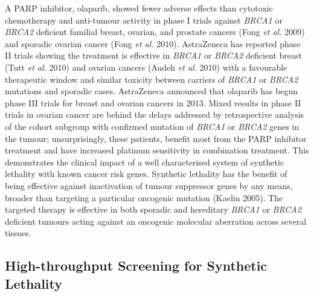 A PARP inhibitor, olaparib, showed fewer adverse effects than cytotoxic chemotherapy and anti-tumour activity in phase I trials against \textit{BRCA1} or \textit{BRCA2} deficient familial breast, ovarian, and prostate cancers (Fong\textit{ et al.} 2009) and sporadic ovarian cancer (Fong\textit{ et al.} 2010). AstraZeneca has reported phase II trials showing the treatment is effective in \textit{BRCA1} or \textit{BRCA2} deficient breast (Tutt\textit{ et al.} 2010) and ovarian cancers (Audeh\textit{ et al.} 2010) with a favourable therapeutic window and similar toxicity between carriers of \textit{BRCA1} or \textit{BRCA2} mutations and sporadic cases. AstraZeneca announced that olaparib has begun phase III trials for breast and ovarian cancers in 2013. Mixed results in phase II trials in ovarian cancer are behind the delays addressed by retrospective analysis of the cohort subgroup with confirmed mutation of \textit{BRCA1} or \textit{BRCA2} genes in the tumour; unsurprisingly, these patients, benefit most from the PARP inhibitor treatment and have increased platinum sensitivity in combination treatment. This demonstrates the clinical impact of a well characterised system of synthetic lethality with known cancer risk genes. Synthetic lethality has the benefit of being effective against inactivation of tumour suppressor genes by any means, broader than targeting a particular oncogenic mutation (Kaelin 2005). The targeted therapy is effective in both sporadic and hereditary \textit{BRCA1} or \textit{BRCA2} deficient tumours acting against an oncogenic molecular aberration across several tissues.  

\subsection[High{}-throughput Screening for Synthetic Lethality]{High-throughput Screening for Synthetic Lethality}


